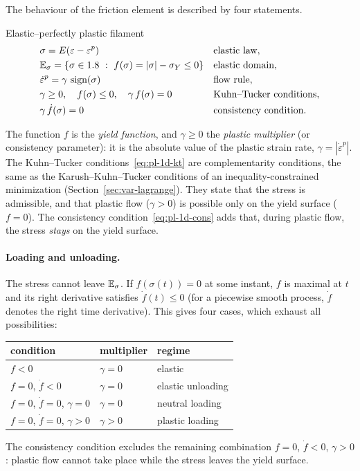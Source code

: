 The behaviour of the friction element is described by four statements.
\begin{gbox}{Elastic--perfectly plastic filament}
%
\begin{align}
  &\sigma=E(\varepsilon-\varepsilon^p) && \text{elastic law},\label{eq:pl-1d-el}\\
  &\mathbb{E}_{\sigma}=\{\sigma\in1.8\ :\ f(\sigma)=|\sigma|-\sigma_{Y}\le0\} && \text{elastic domain},\label{eq:pl-1d-dom}\\
  &\dot\varepsilon^p=\gamma\,\operatorname{sign}(\sigma) && \text{flow rule},\label{eq:pl-1d-flow}\\
  &\gamma\ge0,\quad f(\sigma)\le0,\quad \gamma\,f(\sigma)=0 && \text{Kuhn--Tucker conditions},\label{eq:pl-1d-kt}\\
  &\gamma\,\dot f(\sigma)=0 && \text{consistency condition}.\label{eq:pl-1d-cons}
\end{align}
\end{gbox}
The function $f$ is the \emph{yield function}, and $\gamma\ge0$ the
\emph{plastic multiplier} (or consistency parameter): it is the absolute value
of the plastic strain rate, $\gamma=|\dot\varepsilon^p|$. The Kuhn--Tucker
conditions~\eqref{eq:pl-1d-kt} are complementarity conditions, the same as the
Karush--Kuhn--Tucker conditions of an inequality-constrained minimization
(Section~\ref{sec:var-lagrange}). They state that the stress is admissible,
and that plastic flow ($\gamma>0$) is possible only on the yield surface
($f=0$). The consistency condition~\eqref{eq:pl-1d-cons} adds that, during
plastic flow, the stress \emph{stays} on the yield surface.

\paragraph{Loading and unloading.}
%
The stress cannot leave $\mathbb{E}_{\sigma}$. If $f(\sigma(t))=0$ at some instant, $f$ is
maximal at $t$ and its right derivative satisfies $\dot f(t)\le0$ (for a
piecewise smooth process, $\dot f$ denotes the right time derivative). This
gives four cases, which exhaust all possibilities:
\begin{center}\small
\renewcommand{\arraystretch}{1.15}
\begin{tabular}{@{}lll@{}}
\toprule
condition & multiplier & regime\\
\midrule
$f<0$ & $\gamma=0$ & elastic\\
$f=0$, $\dot f<0$ & $\gamma=0$ & elastic unloading\\
$f=0$, $\dot f=0$, $\gamma=0$ & $\gamma=0$ & neutral loading\\
$f=0$, $\dot f=0$, $\gamma>0$ & $\gamma>0$ & plastic loading\\
\bottomrule
\end{tabular}
\end{center}
The consistency condition excludes the remaining combination $f=0$,
$\dot f<0$, $\gamma>0$: plastic flow cannot take place while the stress
leaves the yield surface.

